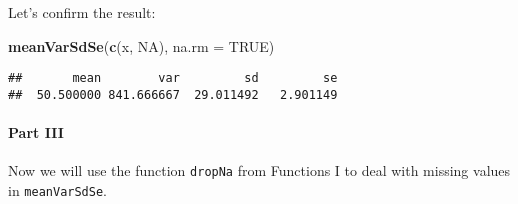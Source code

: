 \documentclass[11,]{article}
\newenvironment{Shaded}{\begin{snugshade}}{\end{snugshade}}
\newcommand{\KeywordTok}[1]{\textcolor[rgb]{0.13,0.29,0.53}{\textbf{{#1}}}}
\newcommand{\DataTypeTok}[1]{\textcolor[rgb]{0.13,0.29,0.53}{{#1}}}
\newcommand{\OtherTok}[1]{\textcolor[rgb]{0.56,0.35,0.01}{{#1}}}
\newcommand{\NormalTok}[1]{{#1}}
\let\oldparagraph\paragraph
\renewcommand{\paragraph}[1]{\oldparagraph{#1}\mbox{}}
\begin{document}
Let's confirm the result:

\begin{Shaded}
\begin{Highlighting}[]
\KeywordTok{meanVarSdSe}\NormalTok{(}\KeywordTok{c}\NormalTok{(x, }\OtherTok{NA}\NormalTok{), }\DataTypeTok{na.rm =} \OtherTok{TRUE}\NormalTok{)}
\end{Highlighting}
\end{Shaded}

\begin{verbatim}
##       mean        var         sd         se 
##  50.500000 841.666667  29.011492   2.901149
\end{verbatim}

\paragraph{Part III}\label{part-iii}

Now we will use the function \texttt{dropNa} from Functions I to deal
with missing values in \texttt{meanVarSdSe}.
\end{document}
